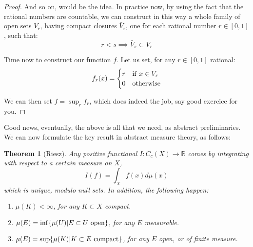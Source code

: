 \documentclass[12pt]{amsbook}
\newtheorem{theorem}{Theorem}[chapter]
\begin{document}
\begin{proof}
And so on, would be the idea. In practice now, by using the fact that the rational numbers are countable, we can construct in this way a whole family of open sets $V_r$, having compact closures $\bar{V}_r$, one for each rational number $r\in[0,1]$, such that:
$$r<s\implies \bar{V}_s\subset V_r$$

Time now to construct our function $f$. Let us set, for any $r\in[0,1]$ rational:
$$f_r(x)=\begin{cases}
r&{\rm if}\ x\in V_r\\
0&{\rm otherwise}
\end{cases}$$

We can then set $f=\sup_rf_r$, which does indeed the job, say good exercice for you.
\end{proof}

Good news, eventually, the above is all that we need, as abstract preliminaries. We can now formulate the key result in abstract measure theory, as follows:

\begin{theorem}[Riesz]
Any positive functional $I:C_c(X)\to\mathbb R$ comes by integrating with respect to a certain measure on $X$,
$$I(f)=\int_Xf(x)d\mu(x)$$
which is unique, modulo null sets. In addition, the following happen:
\begin{enumerate}
\item $\mu(K)<\infty$, for any $K\subset X$ compact.

\item $\mu(E)=\inf\{\mu(U)|E\subset U\ {\rm open}\}$, for any $E$ measurable.

\item $\mu(E)=\sup\{\mu(K)|K\subset E\ {\rm compact}\}$, for any $E$ open, or of finite measure.
\end{enumerate}
\end{theorem}
\end{document}
